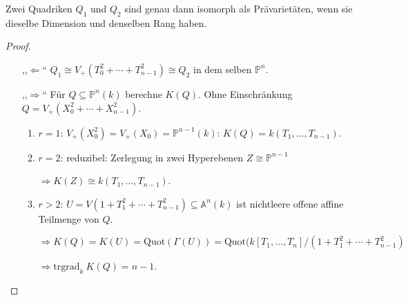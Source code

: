 \begin{cor}[orig. 61]
\label{cor:klassifikation-von-quadriken}	
  Zwei Quadriken $Q_{1}$ und $Q_{2}$ sind genau dann isomorph als
  Prävarietäten, wenn sie dieselbe Dimension und denselben Rang haben.
\end{cor}
\begin{proof}
  \mbox{}
  \begin{itemize}
  \item[,,$\Leftarrow$``]
    $Q_{1}\cong V_{+}(T_{0}^{2}+\cdots+T_{n-1}^{2})\cong Q_{2}$ in
    dem selben $\mathbb{P}^{n}$.
  \item[,,$\Rightarrow$``] Für $Q\subseteq\mathbb{P}^{n}(k)$ berechne
    $K(Q)$. Ohne Einschränkung
    $Q=V_{+}(X_{0}^{2}+\cdots+X_{n-1}^{2})$.
    \begin{enumerate}
    \item $r=1$: $V_{+}(X_{0}^{2})=V_{+}(X_{0})=\mathbb{P}^{n-1}(k)$:
      $K(Q)=k(T_{1},\ldots,T_{n-1})$.
    \item $r=2$: reduzibel: Zerlegung in zwei Hyperebenen
      $Z\cong\mathbb{P}^{n-1}$

      $\Rightarrow K(Z)\cong k(T_{1},\ldots,T_{n-1})$.
    \item $r>2$:
      $U=V(1+T_{1}^{2}+\cdots+T_{n-1}^{2})\subseteq\mathbb{A}^{n}(k)$
      ist nichtleere offene affine Teilmenge von $Q$.

      $\Rightarrow K(Q)=K(U)=\text{Quot}(\Gamma(U))=\text{Quot}(k[T_{1},\ldots,T_{n}]/(1+T_{1}^{2}+\cdots+T_{n-1}^{2})$

      $\Rightarrow\text{trgrad}_{k}\ K(Q)=n-1$. 
    \end{enumerate}
  \end{itemize}
\end{proof}
